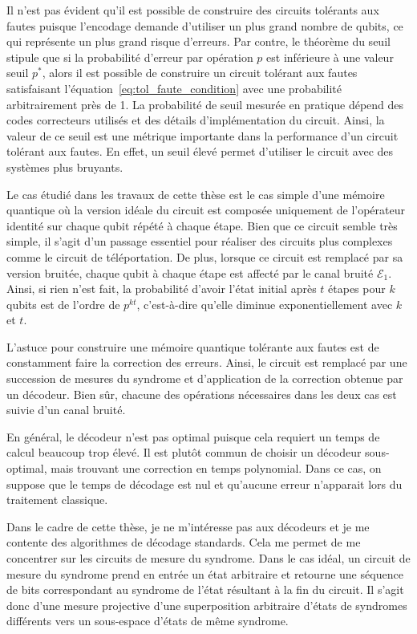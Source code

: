 Il n'est pas évident qu'il est possible de construire des circuits tolérants aux fautes
puisque l'encodage demande d'utiliser un plus grand nombre de qubits,
ce qui représente un plus grand risque d'erreurs.
Par contre,
le théorème du seuil~\cite{aharonov_fault-tolerant_1999} stipule que si la probabilité d'erreur
par opération $p$ est inférieure à une valeur seuil $p^*$,
alors il est possible de construire un circuit tolérant aux fautes satisfaisant
l'équation~\ref{eq:tol_faute_condition} avec une probabilité arbitrairement près de 1.
La probabilité de seuil mesurée en pratique dépend des codes correcteurs utilisés
et des détails d'implémentation du circuit.
Ainsi,
la valeur de ce seuil est une métrique importante dans la performance d'un circuit tolérant aux fautes.
En effet,
un seuil élevé permet d'utiliser le circuit avec des systèmes plus bruyants.

Le cas étudié dans les travaux de cette thèse est le cas simple d'une mémoire quantique 
où la version idéale du circuit est composée uniquement de l'opérateur identité sur chaque qubit répété à chaque étape.
Bien que ce circuit semble très simple,
il s'agit d'un passage essentiel pour réaliser des circuits plus complexes comme le circuit
de téléportation.
De plus,
lorsque ce circuit est remplacé par sa version bruitée,
chaque qubit à chaque étape est affecté par le canal bruité $\mathcal E_1$.
Ainsi,
si rien n'est fait,
la probabilité d'avoir l'état initial après $t$ étapes pour $k$ qubits est de l'ordre de $p^{kt}$,
c'est-à-dire qu'elle diminue exponentiellement avec $k$ et $t$.

L'astuce pour construire une mémoire quantique tolérante aux fautes
est de constamment faire la correction des erreurs.
Ainsi,
le circuit est remplacé par une succession de mesures du syndrome
et d'application de la correction obtenue par un décodeur.
Bien sûr, 
chacune des opérations nécessaires dans les deux cas est suivie d'un canal bruité.

En général,
le décodeur n'est pas optimal puisque cela requiert un temps de calcul beaucoup trop élevé.
Il est plutôt commun de choisir un décodeur sous-optimal,
mais trouvant une correction en temps polynomial.
Dans ce cas,
on suppose que le temps de décodage est nul 
et qu'aucune erreur n'apparait lors du traitement classique.

Dans le cadre de cette thèse,
je ne m'intéresse pas aux décodeurs et je me contente des algorithmes de décodage standards.
Cela me permet de me concentrer sur les circuits de mesure du syndrome.
Dans le cas idéal,
un circuit de mesure du syndrome prend en entrée un état arbitraire et 
retourne une séquence de bits correspondant au syndrome de l'état résultant 
à la fin du circuit.
Il s'agit donc d'une mesure projective d'une superposition arbitraire
d'états de syndromes différents vers un sous-espace d'états de même syndrome.

